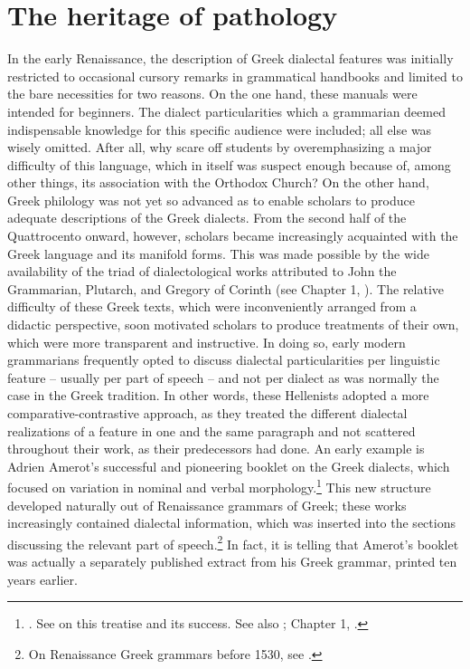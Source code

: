 \section{The heritage of pathology}\label{sec:6.2}

In the early Renaissance, the description of Greek dialectal features was initially restricted to occasional cursory remarks in grammatical handbooks and limited to the bare necessities for two reasons. On the one hand, these manuals were intended for beginners. The dialect particularities which a grammarian deemed indispensable knowledge for this specific audience were included; all else was wisely omitted. After all, why scare off students by overemphasizing a major difficulty of this language, which in itself was suspect enough because of, among other things, its association with the Orthodox Church? On the other hand, Greek philology was not yet so advanced as to enable scholars to produce adequate descriptions of the Greek dialects. From the second half of the Quattrocento onward, however, scholars became increasingly acquainted with the Greek language and its manifold forms. This was made possible by the wide availability of the triad of dialectological works attributed to John the Grammarian, Plutarch, and Gregory of Corinth (see Chapter 1, ). The relative difficulty of these Greek texts, which were inconveniently arranged from a didactic perspective, soon motivated scholars to produce treatments of their own, which were more transparent and instructive. In doing so, early modern grammarians frequently opted to discuss dialectal particularities per linguistic feature – usually per part of speech – and not per dialect as was normally the case in the Greek tradition. In other words, these Hellenists adopted a more comparative-contrastive approach, as they treated the different dialectal realizations of a feature in one and the same paragraph and not scattered throughout their work, as their predecessors had done. An early example is Adrien Amerot’s successful and pioneering booklet on the Greek dialects, which focused on variation in nominal and verbal morphology.\footnote{{\citet{Amerot1530}. See \citet[1--19]{Hoven1985} on this treatise and its success. See also \citet{Hummel1999}; Chapter 1, .}} This new structure developed naturally out of Renaissance grammars of Greek; these works increasingly contained dialectal information, which was inserted into the sections discussing the relevant part of speech.\footnote{{On Renaissance Greek grammars before 1530, see \citet{Botley2010}.}} In fact, it is telling that Amerot’s booklet was actually a separately published extract from his Greek grammar, printed ten years earlier.

